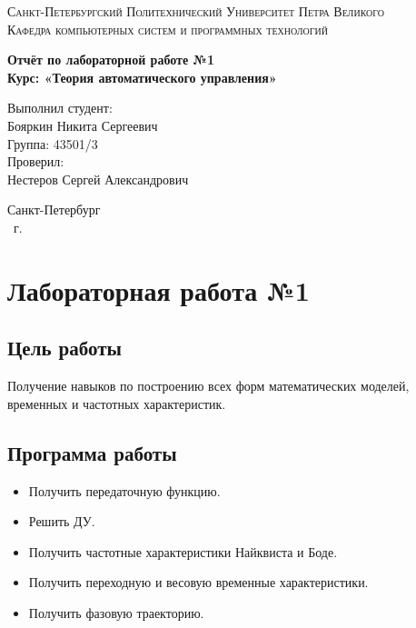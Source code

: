 \documentclass[14pt,a4paper,report]{report}
\begin{document}
\def\contentsname{Содержание}

\begin{titlepage}
	\begin{center}
		\textsc{Санкт-Петербургский Политехнический 
			Университет Петра Великого\\[5mm]
			Кафедра компьютерных систем и программных технологий}
		
		\vfill
		
		\textbf{Отчёт по лабораторной работе №1\\[3mm]
			Курс: «Теория автоматического управления»\\[41mm]
			}
	\end{center}
	
	\hfill
	\begin{minipage}{.5\textwidth}
		Выполнил студент:\\[2mm] 
		Бояркин Никита Сергеевич\\
		Группа: 43501/3\\[5mm]
		
		Проверил:\\[2mm] 
		Нестеров Сергей Александрович
	\end{minipage}
	\vfill
	\begin{center}
		Санкт-Петербург\\ \the\year\ г.
	\end{center}
\end{titlepage}

\tableofcontents
\clearpage

\chapter{Лабораторная работа №1}

\section{Цель работы}

Получение навыков по построению всех форм математических моделей, временных и частотных характеристик.

\section{Программа работы}

\begin{itemize}
	\item Получить передаточную функцию.
	\item Решить ДУ.
	\item Получить частотные характеристики Найквиста и Боде.
	\item Получить переходную и весовую временные характеристики.
	\item Получить фазовую траекторию.
\end{itemize}
\end{document}
